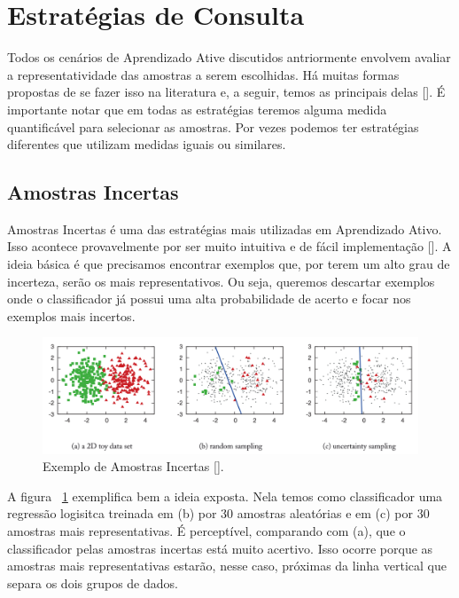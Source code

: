 \section{Estratégias de Consulta}
\label{sec:query_strategy}

Todos os cenários de Aprendizado Ative discutidos antriormente envolvem avaliar a representatividade das amostras a serem escolhidas. Há muitas formas propostas de se fazer isso na literatura e, a seguir, temos as principais delas [\cite{settles2012active}]. É importante notar que em todas as estratégias teremos alguma medida quantificável para selecionar as amostras. Por vezes podemos ter estratégias diferentes que utilizam medidas iguais ou similares.




\subsection{Amostras Incertas} %
\label{sec:amostras_incertas}

Amostras Incertas é uma das estratégias mais utilizadas em Aprendizado Ativo. Isso acontece provavelmente por ser muito intuitiva e de fácil implementação [\cite{settles2014active}]. A ideia básica é que precisamos encontrar exemplos que, por terem um alto grau de incerteza, serão os mais representativos. Ou seja, queremos descartar exemplos onde o classificador já possui uma alta probabilidade de acerto e focar nos exemplos mais incertos.  


\begin{figure}
  \centering
  \includegraphics[width=1.0\textwidth]{figures/settles_2014_uncertainty_sampling_example.png}
  \caption{Exemplo de Amostras Incertas [\cite{settles2014active}].}
  \label{fig:settles_2014_uncertainty_example}
\end{figure}

A figura ~\ref{fig:settles_2014_uncertainty_example} exemplifica bem a ideia exposta. Nela temos como classificador uma regressão logisitca treinada em (b) por 30 amostras aleatórias e em (c) por 30 amostras mais representativas. É perceptível, comparando com (a), que o classificador pelas amostras incertas está muito acertivo. Isso ocorre porque as amostras mais representativas estarão, nesse caso, próximas da linha vertical que separa os dois grupos de dados.

